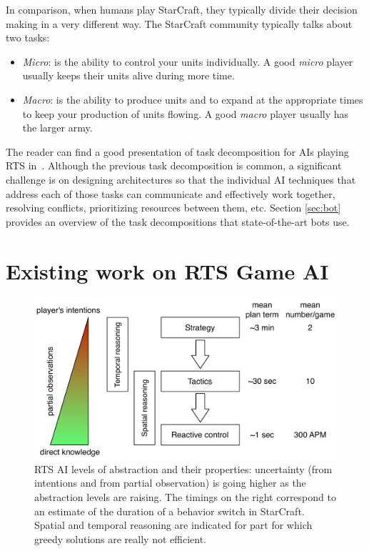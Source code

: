 \documentclass[journal]{IEEEtran}
\begin{document}
In comparison, when humans play StarCraft, they typically divide their decision making in a very different way. The StarCraft community typically talks about two tasks:
\begin{itemize}
  \item {\em Micro}: is the ability to control your units individually. A good \emph{micro} player usually keeps their units alive during more time.
  \item {\em Macro}: is the ability to produce units and to expand at the appropriate times to keep your production of units flowing. A good \emph{macro} player usually has the larger army.
\end{itemize}

The reader can find a  good presentation of task decomposition for AIs
playing RTS in~\cite{weber2011acs}. Although the previous task decomposition is common, a significant challenge is on designing architectures so that the individual AI techniques that address each of those tasks can communicate and effectively work together, resolving conflicts, prioritizing resources between them, etc. Section \ref{sec:bot} provides an overview of the task decompositions that state-of-the-art bots use.


\section{Existing work on RTS Game AI}\label{sec:review}

\begin{figure}
    \centering
    \includegraphics[width=0.9\columnwidth]{figures/levels_abstraction.pdf}
    \caption{RTS AI levels of abstraction and their properties: uncertainty (from intentions and from partial observation) is going higher as the abstraction levels are raising. The timings on the right correspond to an estimate of the duration of a behavior switch in StarCraft. Spatial and temporal reasoning are indicated for part for which greedy solutions are really not efficient.}
    \label{fig:levels-abstraction}
\end{figure}
\end{document}
